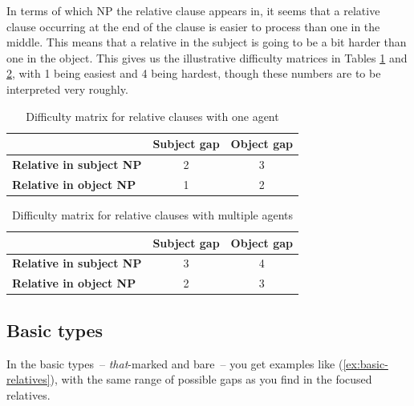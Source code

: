 In terms of which NP the relative clause appears in, it seems that a relative clause occurring at the end of the clause is easier to process than one in the middle. This means that a relative in the subject is going to be a bit harder than one in the object. This gives us the illustrative difficulty matrices in Tables \ref{tab:difficulty-matrix} and \ref{tab:difficulty-matrix2}, with 1 being easiest and 4 being hardest, though these numbers are to be interpreted very roughly.

\begin{table}[ht]
\centering
\begin{tabular}{lcc}
\toprule
 & \textbf{Subject gap} & \textbf{Object gap} \\ 
\midrule
\textbf{Relative in subject NP} & 2   & 3 \\ 
\textbf{Relative in object NP}   & 1   & 2     \\ 
\bottomrule
\end{tabular}
\caption{Difficulty matrix for relative clauses with one agent}
\label{tab:difficulty-matrix}
\end{table}

\begin{table}[ht]
\centering
\begin{tabular}{lcc}
\toprule
 & \textbf{Subject gap} & \textbf{Object gap} \\ 
\midrule
\textbf{Relative in subject NP} & 3   & 4 \\ 
\textbf{Relative in object NP}   & 2   & 3     \\ 
\bottomrule
\end{tabular}
\caption{Difficulty matrix for relative clauses with multiple agents}
\label{tab:difficulty-matrix2}
\end{table}

\subsection{Basic types}

In the basic types~-- \textit{that}-marked and bare~-- you get examples like (\ref{ex:basic-relatives}), with the same range of possible gaps as you find in the focused relatives.

\begin{samepage}
\ea \label{ex:basic-relatives}
    \z
\z
\end{samepage}

